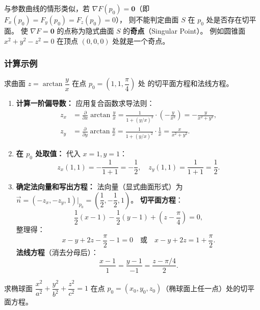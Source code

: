 \documentclass[lang=cn,11pt]{elegantbook}
\begin{document}
\begin{remark}[奇点问题]
与参数曲线的情形类似，若 $\nabla F(p_0)=\boldsymbol{0}$（即
$F_x(p_0)=F_y(p_0)=F_z(p_0)=0$），
则不能判定曲面 $S$ 在 $p_0$ 处是否存在切平面。
使 $\nabla F=\boldsymbol{0}$ 的点称为隐式曲面 $S$ 的\textbf{奇点}（Singular Point）。
例如圆锥面 $x^2+y^2-z^2=0$ 在顶点 $(0,0,0)$ 处就是一个奇点。
\end{remark}

\subsubsection*{计算示例}

\begin{example} \label{ex:arctan-surface}
求曲面 $z=\arctan\dfrac{y}{x}$ 在点 $p_0=\left(1,1,\dfrac{\pi}{4}\right)$ 处
的切平面方程和法线方程。
\end{example}

\begin{solution}
\begin{enumerate}
  \item \textbf{计算一阶偏导数：}
  应用复合函数求导法则：
  \begin{align*}
  z_x &= \frac{\partial}{\partial x}\arctan\frac{y}{x} = \frac{1}{1+(y/x)^2}\cdot\left(-\frac{y}{x^2}\right) = -\frac{y}{x^2+y^2}, \\[6pt]
  z_y &= \frac{\partial}{\partial y}\arctan\frac{y}{x} = \frac{1}{1+(y/x)^2}\cdot\frac{1}{x} = \frac{x}{x^2+y^2}.
  \end{align*}

  \item \textbf{在 $p_0$ 处取值：}
  代入 $x=1, y=1$：
  \[
  z_x(1,1)=-\frac{1}{1+1}=-\frac{1}{2}, \quad z_y(1,1)=\frac{1}{1+1}=\frac{1}{2}.
  \]

  \item \textbf{确定法向量和写出方程：}
  法向量（显式曲面形式）为 $\vec{n}=(-z_x,-z_y,1)\big|_{p_0}=\left(\dfrac{1}{2},-\dfrac{1}{2},1\right)$。
  \textbf{切平面方程}：
  \[
  \frac{1}{2}(x-1)-\frac{1}{2}(y-1)+\left(z-\frac{\pi}{4}\right)=0,
  \]
  整理得：
  \[
  \boxed{x-y+2z-\frac{\pi}{2}-1=0} \quad\text{或}\quad \boxed{x-y+2z=1+\frac{\pi}{2}}.
  \]
  \textbf{法线方程}（消去分母后）：
  \[
  \boxed{\frac{x-1}{1}=\frac{y-1}{-1}=\frac{z-\pi/4}{2}}.
  \]
\end{enumerate}
\end{solution}

\begin{example} \label{ex:ellipsoid-tangent}
求椭球面 $\dfrac{x^2}{a^2}+\dfrac{y^2}{b^2}+\dfrac{z^2}{c^2}=1$
在点 $p_0=(x_0,y_0,z_0)$（椭球面上任一点）处的切平面方程。
\end{example}
\end{document}
